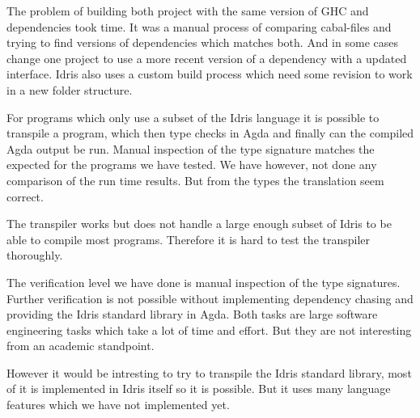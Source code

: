 
The problem of building both project with the same version of GHC and
dependencies took time. It was a manual process of comparing cabal-files and
trying to find versions of dependencies which matches both. And in some cases
change one project to use a more recent version of a dependency with a updated
interface. Idris also uses a custom build process which need some revision to
work in a new folder structure.


For programs which only use a subset of the Idris
language it is possible to transpile a program, which then type checks in Agda
and finally can the compiled Agda output be run. Manual inspection of the type
signature matches the expected for the programs we have tested. We have
however, not done any comparison of the run time results. But from the types
the translation seem correct.

The transpiler works but does not handle a large enough subset of Idris to be
able to compile most programs. Therefore it is hard to test the transpiler
thoroughly.


The verification level we have done is manual inspection of the type
signatures. Further verification is not possible without implementing
dependency chasing and providing the Idris standard library in Agda. Both tasks
are large software engineering tasks which take a lot of time and effort. But
they are not interesting from an academic standpoint.

However it would be intresting to try to transpile the Idris standard library,
most of it is implemented in Idris itself so it is possible. But it uses many
language features which we have not implemented yet.

